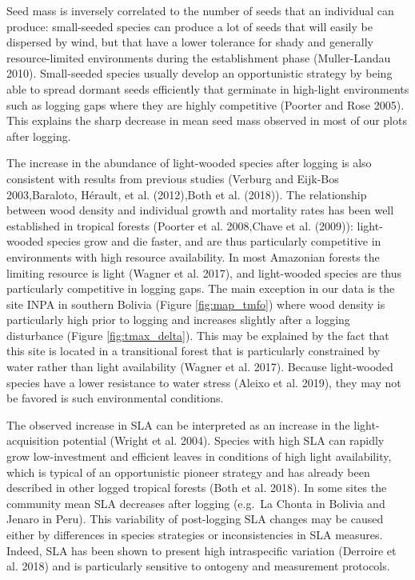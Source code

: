 \documentclass[]{elsarticle} %
\begin{document}
Seed mass is inversely correlated to the number of seeds that an
individual can produce: small-seeded species can produce a lot of seeds
that will easily be dispersed by wind, but that have a lower tolerance
for shady and generally resource-limited environments during the
establishment phase (Muller-Landau 2010). Small-seeded species usually
develop an opportunistic strategy by being able to spread dormant seeds
efficiently that germinate in high-light environments such as logging
gaps where they are highly competitive (Poorter and Rose 2005). This
explains the sharp decrease in mean seed mass observed in most of our
plots after logging.

The increase in the abundance of light-wooded species after logging is
also consistent with results from previous studies (Verburg and Eijk-Bos
2003,Baraloto, Hérault, et al. (2012),Both et al. (2018)). The
relationship between wood density and individual growth and mortality
rates has been well established in tropical forests (Poorter et al.
2008,Chave et al. (2009)): light-wooded species grow and die faster, and
are thus particularly competitive in environments with high resource
availability. In most Amazonian forests the limiting resource is light
(Wagner et al. 2017), and light-wooded species are thus particularly
competitive in logging gaps. The main exception in our data is the site
INPA in southern Bolivia (Figure \ref{fig:map_tmfo}) where wood density
is particularly high prior to logging and increases slightly after a
logging disturbance (Figure \ref{fig:tmax_delta}). This may be explained
by the fact that this site is located in a transitional forest that is
particularly constrained by water rather than light availability (Wagner
et al. 2017). Because light-wooded species have a lower resistance to
water stress (Aleixo et al. 2019), they may not be favored is such
environmental conditions.

The observed increase in SLA can be interpreted as an increase in the
light-acquisition potential (Wright et al. 2004). Species with high SLA
can rapidly grow low-investment and efficient leaves in conditions of
high light availability, which is typical of an opportunistic pioneer
strategy and has already been described in other logged tropical forests
(Both et al. 2018). In some sites the community mean SLA decreases after
logging (e.g.~La Chonta in Bolivia and Jenaro in Peru). This variability
of post-logging SLA changes may be caused either by differences in
species strategies or inconsistencies in SLA measures. Indeed, SLA has
been shown to present high intraspecific variation (Derroire et al.
2018) and is particularly sensitive to ontogeny and measurement
protocols.
\end{document}
